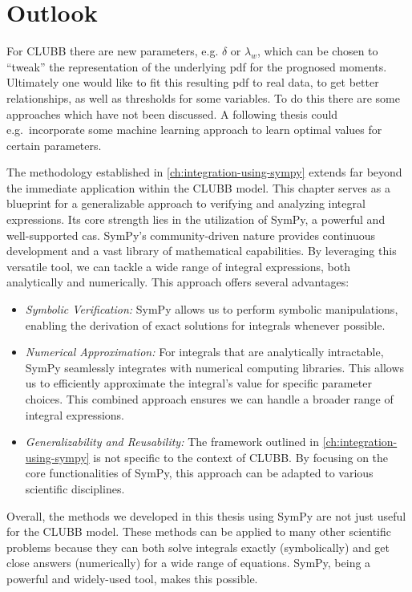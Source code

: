 \chapter{Outlook}\label{ch:outlook}

For \gls{CLUBB} there are new parameters,
e.g. $\delta$ or $\lambda_w$,
which can be chosen to \enquote{tweak} the representation of the underlying \gls{pdf} for the prognosed moments.
Ultimately one would like to fit this resulting \gls{pdf} to real data,
to get better relationships, as well as thresholds for some variables.
To do this there are some approaches which have not been discussed.
A following thesis could e.g.\ incorporate some machine learning approach to learn optimal values for certain parameters.

The methodology established in \cref{ch:integration-using-sympy} extends far beyond the immediate application within the \gls{CLUBB} model.
This chapter serves as a blueprint for a generalizable approach to verifying and analyzing integral expressions.
Its core strength lies in the utilization of SymPy, a powerful and well-supported \gls{cas}.
SymPy's community-driven nature provides continuous development and a vast library of mathematical capabilities.
By leveraging this versatile tool,
we can tackle a wide range of integral expressions, both analytically and numerically.
This approach offers several advantages:
\begin{itemize}
    \item \emph{Symbolic Verification:}
    SymPy allows us to perform symbolic manipulations, enabling the derivation of exact solutions for integrals whenever possible.
    \item \emph{Numerical Approximation:}
    For integrals that are analytically intractable, SymPy seamlessly integrates with numerical computing libraries.
    This allows us to efficiently approximate the integral's value for specific parameter choices.
    This combined approach ensures we can handle a broader range of integral expressions.
    \item \emph{Generalizability and Reusability:}
    The framework outlined in \cref{ch:integration-using-sympy} is not specific to the context of \gls{CLUBB}.
    By focusing on the core functionalities of SymPy, this approach can be adapted to various scientific disciplines.
\end{itemize}
Overall, the methods we developed in this thesis using SymPy are not just useful for the \gls{CLUBB} model.
These methods can be applied to many other scientific problems
because they can both solve integrals exactly (symbolically) and get close answers (numerically) for a wide range of equations.
SymPy, being a powerful and widely-used tool, makes this possible.
